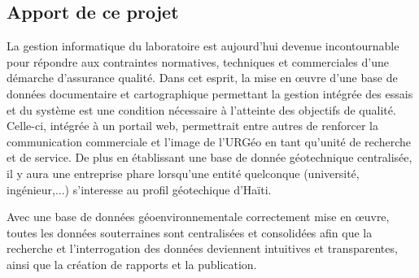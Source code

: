     \subsection{Apport de ce projet}
    La gestion informatique du laboratoire est aujourd’hui devenue incontournable pour répondre aux contraintes normatives, techniques et commerciales d’une démarche d’assurance qualité. Dans cet esprit, la mise en œuvre d’une base de données documentaire et cartographique permettant la gestion intégrée des essais et du système est une condition nécessaire à l’atteinte des objectifs de qualité. Celle-ci, intégrée à un portail web, permettrait entre autres de renforcer la communication commerciale et l’image de l’URGéo en tant qu’unité de recherche et de service.
De plus en établissant une base de donnée géotechnique centralisée, il y aura une entreprise phare lorsqu’une entité quelconque (université, ingénieur,...) s’interesse au profil géotechique d’Haïti.
 \par 
    Avec une base de données géoenvironnementale correctement mise en œuvre, 
    toutes les données souterraines sont centralisées et consolidées afin que 
    la recherche et l'interrogation des données deviennent intuitives et 
    transparentes, ainsi que la création de rapports et la publication.
